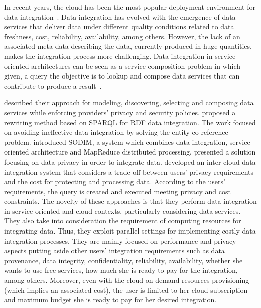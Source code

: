 In recent years, the cloud has been the most popular deployment environment for data integration~\cite{Carvalho2015}.
Data integration has evolved with the emergence of data services that deliver data under different quality conditions related to data freshness, cost, reliability, availability, among others. 
%
However, the lack of an associated meta-data describing the data, currently produced in huge quantities, makes the integration process more challenging. 
%
Data integration in service-oriented architectures can be seen as a service composition problem in which given, a query the objective is to lookup and compose data services that can contribute to produce a result~\cite{Benslimane:2013, Correndo2010, ElSheikh2013, Tian2010, YauY08}. 
%

\cite{Benslimane:2013} described their approach for modeling, discovering, selecting and composing data services while enforcing providers' privacy and security policies.
\cite{Correndo2010} proposed a rewriting method based on SPARQL for RDF data integration. The work focused on avoiding ineffective data integration by solving the entity co-reference problem. \cite{ElSheikh2013} introduced SODIM, a system which combines data integration, service-oriented architecture and MapReduce distributed processing. \cite{YauY08} presented a solution focusing on data privacy in order to integrate data. \cite{Tian2010} developed an inter-cloud data integration system that considers a trade-off between users' privacy requirements and the cost for protecting and processing data. According to the users' requirements, the query is created and executed meeting privacy and cost constraints. 
%
The novelty of these approaches is that they perform data integration in service-oriented and cloud contexts, particularly considering data services. They also take into consideration the requirement of computing resources for integrating data. Thus, they exploit parallel settings for implementing costly data integration processes. They are mainly focused on performance and privacy aspects putting aside other users' integration requirements such as data provenance, data integrity, confidentiality, reliability, availability, whether she wants to use free services, how much she is ready to pay for the integration, among others. 
%
Moreover, even with the cloud on-demand resources provisioning (which implies an  associated cost), the user is limited to her cloud subscription and maximum budget she is ready to pay for her desired integration. 

